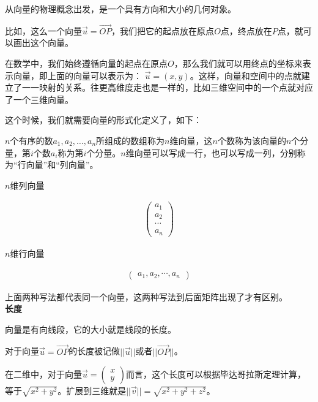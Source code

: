 \documentclass[UTF8]{ctexart}
\begin{document}
从向量的物理概念出发，是一个具有方向和大小的几何对象。

比如，这么一个向量$\vec{u}=\overrightarrow{OP}$，我们把它的起点放在原点$O$点，终点放在$P$点，就可以画出这个向量。

在数学中，我们始终遵循向量的起点在原点$O$，那么我们就可以用终点的坐标来表示向量，即上面的向量可以表示为： $\vec{u}=(x,y)$。这样，向量和空间中的点就建立了一一映射的关系。往更高维度走也是一样的，比如三维空间中的一个点就对应了一个三维向量。

这个时候，我们就需要向量的形式化定义了，如下：

$n$个有序的数$a_{1},a_{2},\dots,a_{n}$所组成的数组称为$n$维向量，这$n$个数称为该向量的$n$个分量，第$i$个数$a_{i}$称为第$i$个分量。$n$维向量可以写成一行，也可以写成一列，分别称为“行向量”和“列向量”。

$n$维列向量

\begin{equation}
\begin{aligned}
\begin{pmatrix}
a_{1}\\
a_{2}\\
\cdots\\
a_{n}
\end{pmatrix}
\end{aligned}
\end{equation}

$n$维行向量

\begin{equation}
\begin{aligned}
\begin{pmatrix}
a_{1},a_{2},\cdots,a_{n}
\end{pmatrix}
\end{aligned}
\end{equation}

上面两种写法都代表同一个向量，这两种写法到后面矩阵出现了才有区别。 \\

\textbf{长度}

向量是有向线段，它的大小就是线段的长度。

对于向量$\vec{u}=\overrightarrow{OP}$的长度被记做$||\vec{u}||$或者$||\overrightarrow{OP}||$。

在二维中，对于向量$\vec{u}=\begin{pmatrix} x\\ y \end{pmatrix}$而言，这个长度可以根据毕达哥拉斯定理计算，等于$\sqrt{x^{2}+y^{2}}$。扩展到三维就是$||\vec{v}||=\sqrt{x^{2}+y^{2}+z^{2}}$。
\end{document}

